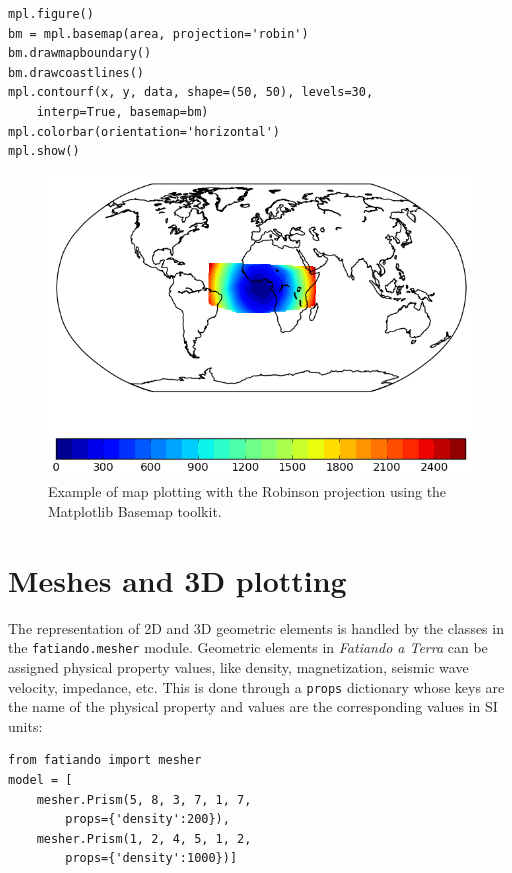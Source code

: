 \begin{verbatim}
mpl.figure()
bm = mpl.basemap(area, projection='robin')
bm.drawmapboundary()
bm.drawcoastlines()
mpl.contourf(x, y, data, shape=(50, 50), levels=30,
    interp=True, basemap=bm)
mpl.colorbar(orientation='horizontal')
mpl.show()
\end{verbatim}

\begin{figure}
    \centering
    \includegraphics[width=\textwidth]{figures/paper-fatiando/gridding_plotting_basemap}
    \caption{
        Example of map plotting with the Robinson projection using the
        Matplotlib Basemap toolkit.
    }
    \label{fig:p1-basemap}
\end{figure}



\section{Meshes and 3D plotting}

The representation of 2D and 3D geometric elements is handled by the
classes in the \texttt{fatiando.mesher} module. Geometric elements in
\textit{Fatiando a Terra} can be assigned physical property values, like density,
magnetization, seismic wave velocity, impedance, etc. This is done
through a \texttt{props} dictionary whose keys are the name of the
physical property and values are the corresponding values in SI units:

\begin{verbatim}
from fatiando import mesher
model = [
    mesher.Prism(5, 8, 3, 7, 1, 7,
        props={'density':200}),
    mesher.Prism(1, 2, 4, 5, 1, 2,
        props={'density':1000})]
\end{verbatim}

